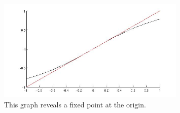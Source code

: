 \documentclass[12pt]{article}
\newenvironment{myenv}{\begin{adjustwidth}{1cm}{}}{\end{adjustwidth}}
\begin{document}
\begin{myenv}
\begin{figure} [H]
    \centering
    \includegraphics[width=0.8\textwidth]{secant2e}
    \caption{This graph reveals a fixed point at the origin. }
    \label{figure:a4}
\end{figure}

\end{myenv}
\end{document}
